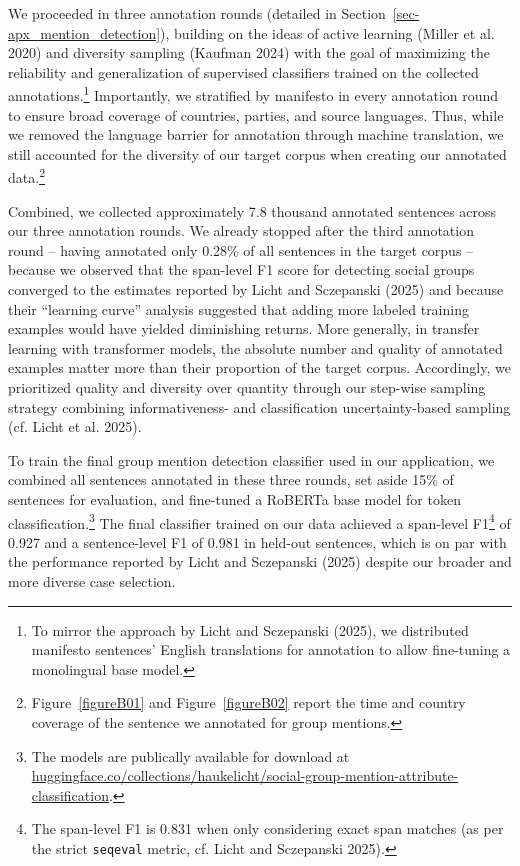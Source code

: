 \documentclass[12pt]{article}
\begin{document}
We proceeded in three annotation rounds (detailed in Section~\ref{sec-apx_mention_detection}), building on the ideas of active learning (Miller et al. 2020) and diversity sampling (Kaufman 2024) with the goal of maximizing the reliability and generalization of supervised classifiers trained on the collected annotations.\footnote{To mirror the approach by Licht and Sczepanski (2025), we distributed manifesto sentences' English translations for annotation to allow fine-tuning a monolingual base model.} Importantly, we stratified by manifesto in every annotation round to ensure broad coverage of countries, parties, and source languages.
Thus, while we removed the language barrier for annotation through machine translation, we still accounted for the diversity of our target corpus when creating our annotated data.\footnote{
  Figure~\ref{figureB01} and Figure~\ref{figureB02} report the time and country coverage of the sentence we annotated for group mentions.
}

Combined, we collected approximately 7.8 thousand annotated sentences across our three annotation rounds.
We already stopped after the third annotation round -- having annotated only 0.28\% of all sentences in the target corpus -- because we observed that the span-level F1 score for detecting social groups converged to the estimates reported by Licht and Sczepanski (2025) and because their ``learning curve'' analysis suggested that adding more labeled training examples would have yielded diminishing returns.
More generally, in transfer learning with transformer models, the absolute number and quality of annotated examples matter more than their proportion of the target corpus.
Accordingly, we prioritized quality and diversity over quantity through our step-wise sampling strategy combining informativeness- and classification uncertainty-based sampling (cf. Licht et al. 2025).

To train the final group mention detection classifier used in our application, we combined all sentences annotated in these three rounds, set aside 15\% of sentences for evaluation, and fine-tuned a RoBERTa base model for token classification.\footnote{%
  The models are publically available for download at \href{https://huggingface.co/collections/haukelicht/social-group-mention-attribute-classification}{huggingface.co/collections/haukelicht/social-group-mention-attribute-classification}.%
}
The final classifier trained on our data achieved a span-level F1\footnote{The span-level F1 is 0.831 when only considering exact span matches (as per the strict \texttt{seqeval} metric, cf. Licht and Sczepanski 2025).} of 0.927 and a sentence-level F1 of 0.981 in held-out sentences, which is on par with the performance reported by Licht and Sczepanski (2025) despite our broader and more diverse case selection.
\end{document}
